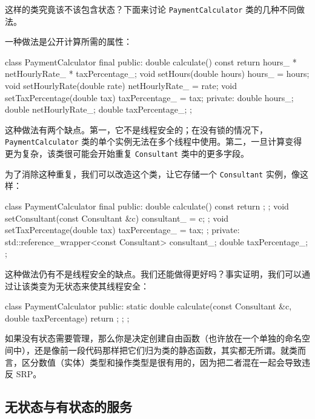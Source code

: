 这样的类究竟该不该包含状态？下面来讨论 \texttt{Payment\allowbreak{}Calculator} 类的几种不同做法。

一种做法是公开计算所需的属性：

\begin{codebox}[cpp]
class PaymentCalculator final {
public:
    double calculate() const { return hours_ * netHourlyRate_ * taxPercentage_; }
    void setHours(double hours) { hours_ = hours; }
    void setHourlyRate(double rate) { netHourlyRate_ = rate; }
    void setTaxPercentage(double tax) { taxPercentage_ = tax; }
private:
    double hours_{};
    double netHourlyRate_{};
    double taxPercentage_{};
};
\end{codebox}

\label{idx:082}
\label{idx:083}
这种做法有两个缺点。第一，它不是线程安全的；在没有锁的情况下，\texttt{Payment\allowbreak{}Calculator} 类的单个实例无法在多个线程中使用。第二，一旦计算变得更为复杂，该类很可能会开始重复 \texttt{Consultant} 类中的更多字段。

为了消除这种重复，我们可以改造这个类，让它存储一个 \texttt{Consultant} 实例，像这样：

\begin{codebox}[cpp]
class PaymentCalculator final {
public:
    double calculate() const { return {}; };
    void setConsultant(const Consultant &c) { consultant_ = c; };
    void setTaxPercentage(double tax) { taxPercentage_ = tax; };
private:
    std::reference_wrapper<const Consultant> consultant_;
    double taxPercentage_{};
};
\end{codebox}

这种做法仍有不是线程安全的缺点。我们还能做得更好吗？事实证明，我们可以通过让该类变为无状态来使其线程安全：

\begin{codebox}[cpp]
class PaymentCalculator {
public:
    static double calculate(const Consultant &c, double taxPercentage) { return {}; };
};
\end{codebox}

\label{idx:084}
\label{idx:085}
如果没有状态需要管理，那么你是决定创建自由函数（也许放在一个单独的命名空间中），还是像前一段代码那样把它们归为类的静态函数，其实都无所谓。就类而言，区分数值（实体）类型和操作类型是很有用的，因为把二者混在一起会导致违反 SRP。

\subsection{无状态与有状态的服务}

